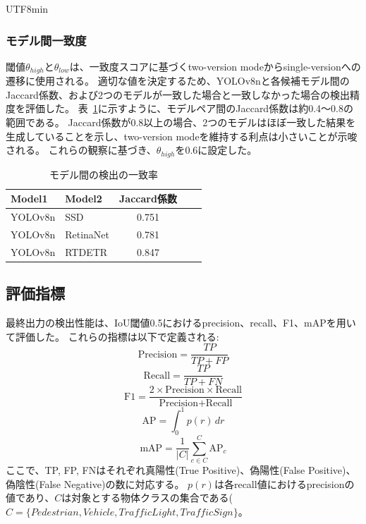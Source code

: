 \documentclass[conference, dvipdfmx]{IEEEtran}
\begin{document}
\begin{CJK}{UTF8}{min}
\subsubsection{モデル間一致度}
\label{inter-model agreement}
閾値$\theta_{high}$と$\theta_{low}$は、一致度スコアに基づくtwo-version modeからsingle-versionへの遷移に使用される。
適切な値を決定するため、YOLOv8nと各候補モデル間のJaccard係数、および2つのモデルが一致した場合と一致しなかった場合の検出精度を評価した。
表~\ref{tab:Evaluation of the relationship between output agreement and accuracy}に示すように、モデルペア間のJaccard係数は約0.4〜0.8の範囲である。
Jaccard係数が0.8以上の場合、2つのモデルはほぼ一致した結果を生成していることを示し、two-version modeを維持する利点は小さいことが示唆される。
これらの観察に基づき、$\theta_{high}$を0.6に設定した。

\begin{table}[ht]
    \centering
    \caption{モデル間の検出の一致率}
    \begin{tabular}{llccc}
        \hline
        Model1 & Model2 & Jaccard係数 \\
        \hline
        YOLOv8n & SSD          & 0.751 \\
        YOLOv8n & RetinaNet    & 0.781 \\
        YOLOv8n & RTDETR       & 0.847 \\
        \hline
    \end{tabular}
    \label{tab:Evaluation of the relationship between output agreement and accuracy}
\end{table}


\subsection{評価指標}
最終出力の検出性能は、IoU閾値0.5におけるprecision、recall、F1、mAPを用いて評価した。
これらの指標は以下で定義される:
\begin{equation}
    \text{Precision} = \frac{TP}{TP + FP}
\end{equation}
\begin{equation}
    \text{Recall} = \frac{TP}{TP + FN}
\end{equation}
\begin{equation}
    \text{F1} = \frac{2 \times \text{Precision} \times \text{Recall}}
    {\text{Precision} + \text{Recall}}
\end{equation}
\begin{equation}
    \text{AP} = \int_0^1 p(r)\, dr
\end{equation}
\begin{equation}
    \text{mAP} = \frac{1}{|C|} \sum_{c\in C}^{C} \text{AP}_c
\end{equation}
ここで、TP, FP, FNはそれぞれ真陽性(True Positive)、偽陽性(False Positive)、偽陰性(False Negative)の数に対応する。
$p(r)$は各recall値におけるprecisionの値であり、$C$は対象とする物体クラスの集合である($C=\{Pedestrian, Vehicle, TrafficLight, TrafficSign\}$。


\end{CJK}
\end{document}
